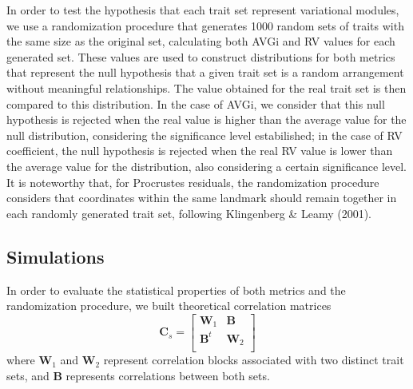 \documentclass[12pt,]{article}
\begin{document}
In order to test the hypothesis that each trait set represent
variational modules, we use a randomization procedure that generates
1000 random sets of traits with the same size as the original set,
calculating both AVGi and RV values for each generated set. These values
are used to construct distributions for both metrics that represent the
null hypothesis that a given trait set is a random arrangement without
meaningful relationships. The value obtained for the real trait set is
then compared to this distribution. In the case of AVGi, we consider
that this null hypothesis is rejected when the real value is higher than
the average value for the null distribution, considering the
significance level estabilished; in the case of RV coefficient, the null
hypothesis is rejected when the real RV value is lower than the average
value for the distribution, also considering a certain significance
level. It is noteworthy that, for Procrustes residuals, the
randomization procedure considers that coordinates within the same
landmark should remain together in each randomly generated trait set,
following Klingenberg \& Leamy (2001).

\subsection{Simulations}\label{simulations}

In order to evaluate the statistical properties of both metrics and the
randomization procedure, we built theoretical correlation matrices \[
\mathbf{C}_{s} =
\begin{bmatrix}
\mathbf{W}_1 & \mathbf{B} \\
\mathbf{B}^t & \mathbf{W}_2 \\
\end{bmatrix}
\] where $\mathbf{W}_1$ and $\mathbf{W}_2$ represent correlation blocks
associated with two distinct trait sets, and $\mathbf{B}$ represents
correlations between both sets.
\end{document}
